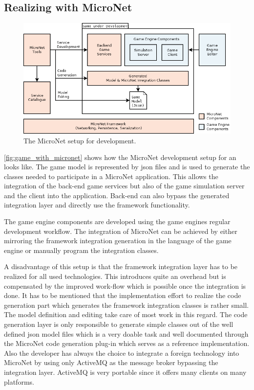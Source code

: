 \subsection{Realizing \ogs{} with MicroNet}

\begin{figure}
	\centering
	\includegraphics[width=\textwidth]{images/architecture/GameWithMicroNet}
	\caption{The MicroNet setup for \og{} development.}
	\label{fig:game_with_micronet}
\end{figure}

\autoref{fig:game_with_micronet} shows how the MicroNet development setup for an
\og{} looks like. The game model is represented by \gls{json} files and is used
to generate the classes needed to participate in a MicroNet application. This
allows the integration of the back-end game services but also of the game
simulation server and the client into the application. Back-end can also bypass
the generated integration layer and directly use the framework functionality.

The game engine components are developed using the game engines regular
development workflow. The integration of MicroNet can be achieved by either
mirroring the framework integration generation in the language of the game
engine or manually program the integration classes.

A disadvantage of this setup is that the framework integration layer has to be
realized for all used technologies. This introduces quite an overhead but is
compensated by the improved work-flow which is possible once the integration is
done. It has to be mentioned that the implementation effort to realize the code
generation part which generates the framework integration classes is rather
small. The model definition and editing take care of most work in this regard.
The code generation layer is only responsible to generate simple classes out of
the well defined \gls{json} model files which is a very doable task and well
documented through the MicroNet code generation plug-in which serves as a
reference implementation. Also the developer has always the choice to integrate a foreign
technology into MicroNet by using only ActiveMQ as the message broker bypassing
the integration layer. ActiveMQ is very portable since it offers many clients on
many platforms.

